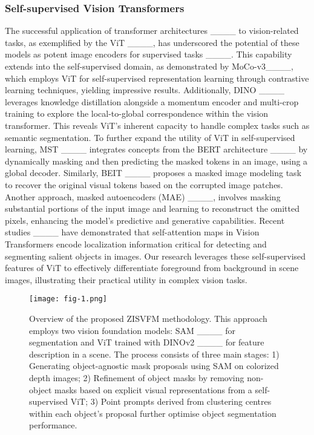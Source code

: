 \subsubsection{Self-supervised Vision Transformers}
The successful application of transformer architectures ____ to vision-related tasks, as exemplified by the ViT ____, has underscored the potential of these models as potent image encoders for supervised tasks ____. This capability extends into the self-supervised domain, as demonstrated by MoCo-v3____, which employs ViT for self-supervised representation learning through contrastive learning techniques, yielding impressive results.
Additionally, DINO ____ leverages knowledge distillation alongside a momentum encoder and multi-crop training to explore the local-to-global correspondence within the vision transformer. This reveals ViT's inherent capacity to handle complex tasks such as semantic segmentation.
To further expand the utility of ViT in self-supervised learning, MST ____ integrates concepts from the BERT architecture ____ by dynamically masking and then predicting the masked tokens in an image, using a global decoder. Similarly, BEIT ____  proposes a masked image modeling task to recover the original visual tokens based on the corrupted image patches. Another approach, masked autoencoders (MAE) ____, involves masking substantial portions of the input image and learning to reconstruct the omitted pixels, enhancing the model's predictive and generative capabilities.
Recent studies ____ have demonstrated that self-attention maps in Vision Transformers encode localization information critical for detecting and segmenting salient objects in images. Our research leverages these self-supervised features of ViT to effectively differentiate foreground from background in scene images, illustrating their practical utility in complex vision tasks.
\begin{figure*}
	\centering
	\texttt{[image: fig-1.png]}
	\centering
	\caption{Overview of the proposed ZISVFM methodology. This approach employs two vision foundation models: SAM ____ for segmentation and ViT trained with DINOv2 ____ for feature description in a scene. The process consists of three main stages: 1) Generating object-agnostic mask proposals using SAM on colorized depth images; 2) Refinement of object masks by removing non-object masks based on  explicit visual representations from a self-supervised ViT; 3) Point prompts derived from clustering centres within each object's proposal further optimise object segmentation performance.}
	\label{fig1}
\end{figure*}
